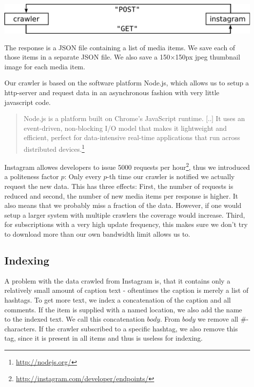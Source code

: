 \documentclass[11pt]{article}
\begin{document}
		\vspace{0.5cm}\includegraphics[width=\textwidth,keepaspectratio]{crawler.pdf}

		The response is a JSON file containing a list of media items. We save each of those items in a separate JSON file. We also save a 150$\times$150px jpeg thumbnail image for each media item.

		Our crawler is based on the software platform Node.js, which allows us to setup a http-server and request data in an asynchronous fashion with very little javascript code.
		\begin{quote}
			Node.js is a platform built on Chrome's JavaScript runtime. [..] It uses an event-driven, non-blocking I/O model that makes it lightweight and efficient, perfect for data-intensive real-time applications that run across distributed devices.\footnote{\url{http://nodejs.org/}}
		\end{quote}

		Instagram allowes developers to issue 5000 requests per hour\footnote{\url{http://instagram.com/developer/endpoints/}}, thus we introduced a politeness factor $p$: Only every $p$-th time our crawler is notified we actually request the new data. This has three effects: First, the number of requests is reduced and second, the number of new media items per response is higher. It also means that we probably miss a fraction of the data. However, if one would setup a larger system with multiple crawlers the coverage would increase. Third, for subscriptions with a very high update frequency, this makes sure we don't try to download more than our own bandwidth limit allows us to.

	\subsection{Indexing}
		A problem with the data crawled from Instagram is, that it contains only a relatively small amount of caption text - oftentimes the caption is merely a list of hashtags. To get more text, we index a concatenation of the caption and all comments. If the item is supplied with a named location, we also add the name to the indexed text. We call this concatenation $body$. From $body$ we remove all $\#$-characters. If the crawler subscribed to a specific hashtag, we also remove this tag, since it is present in all items and thus is useless for indexing.
\end{document}
